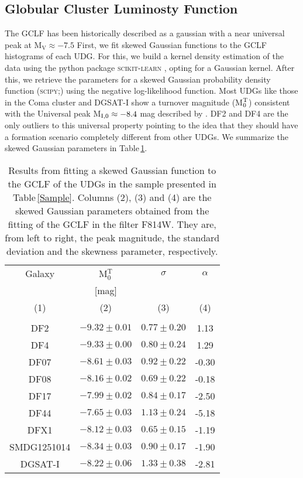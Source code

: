 \documentclass[baaa]{baaa}
\begin{document}
\subsection{Globular Cluster Luminosty Function}\label{subsec:gclf}
The GCLF has been historically described as a gaussian with a near universal peak at M$_{\textrm{V}}\approx -7.5$ \cite{harris_gclf}
First, we fit skewed Gaussian functions to the GCLF histograms of each UDG. For this, we build a kernel density estimation of the data using the python package \textsc{scikit-learn} \citep{scikit-learn}, opting for a Gaussian kernel. After this, we retrieve the parameters for a skewed Gaussian probability density function (\textsc{scipy};\citealt{2020SciPy-NMeth}) using the negative log-likelihood function.
Most UDGs like those in the Coma cluster and DGSAT-I show a turnover magnitude (M$_{\rm 0}^{\rm T}$) consistent with the Universal peak M$_{\rm I,0} \approx -8.4$ mag described by \cite{harris_gclf}. DF2 and DF4 are the only outliers to this universal property pointing to the idea that they should have a formation scenario completely different from other UDGs.
We summarize the skewed Gaussian parameters in Table\,\ref{tab:table2}. 
\begin{table}[]
    \centering
    \begin{tabular}{cccc}
    \hline \hline 
        Galaxy & M$_{\text{0}}^{\text{T}}$  & $\sigma$ & $\alpha$  \\ 
         & [mag]& & \\
        (1) & (2)& (3) &(4) \\\hline\\
        DF2 & $-9.32 \pm 0.01$ & $0.77 \pm 0.20$ & 1.13   \\ 
        DF4 & $-9.33 \pm 0.00$ & $0.80\pm 0.24 $ & 1.29   \\ 
        DF07        & $-8.61 \pm 0.03$ & $0.92 \pm 0.22$ & -0.30  \\ 
        DF08        & $-8.16 \pm 0.02$ & $0.69 \pm 0.22$ & -0.18  \\ 
        DF17        & $-7.99 \pm 0.02$ & $0.84 \pm 0.17$ & -2.50  \\ 
        DF44        & $-7.65 \pm 0.03$ & $1.13 \pm 0.24$ & -5.18  \\ 
        DFX1        & $-8.12 \pm 0.03$ & $0.65 \pm 0.15$ & -1.19  \\ 
        SMDG1251014 & $-8.34 \pm 0.03$ & $0.90 \pm 0.17$ & -1.90  \\ 
        DGSAT-I     & $-8.22 \pm 0.06$ & $1.33 \pm 0.38$ & -2.81  \\ \hline
    \end{tabular}
    \caption{ Results from fitting a skewed Gaussian function to the GCLF of the UDGs in the sample presented in Table\,\ref{Sample}. Columns (2), (3) and (4) are the skewed Gaussian parameters obtained from the fitting of the GCLF in the filter F814W. They are, from left to right, the peak magnitude, the standard deviation and the skewness parameter, respectively.}
    \label{tab:table2}
\end{table}
\end{document}

